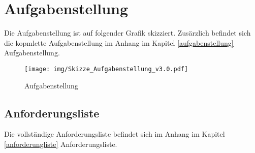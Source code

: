 \section{Aufgabenstellung}

Die Aufgabenstellung ist auf folgender Grafik skizziert. Zusärzlich befindet sich die kopmlette Aufgabenstellung im Anhang im Kapitel \ref{aufgabenstellung} Aufgabenstellung.

\begin{figure}[H]
\centering
\texttt{[image: img/Skizze\_Aufgabenstellung\_v3.0.pdf]}
\caption{Aufgabenstellung}
\label{fig:aufgebanstellung}
\end{figure}

\subsection{Anforderungsliste}

Die vollständige Anforderungsliste befindet sich im Anhang im Kapitel \ref{anforderungliste} Anforderungsliste.